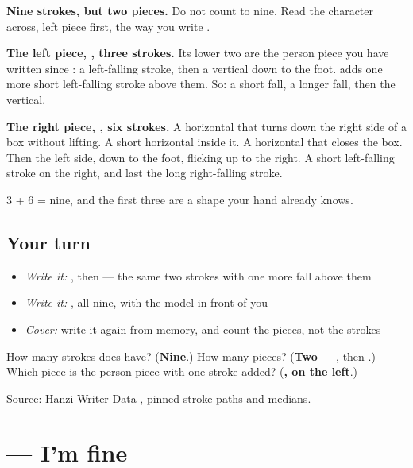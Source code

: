 \begin{quote}
\end{quote}

\textbf{Nine strokes, but two pieces.} Do not count to nine. Read the character across, left piece first, the way you write .

\textbf{The left piece, , three strokes.} Its lower two are the person piece  you have written since : a left-falling stroke, then a vertical down to the foot.  adds one more short left-falling stroke above them. So: a short fall, a longer fall, then the vertical.

\textbf{The right piece, , six strokes.} A horizontal that turns down the right side of a box without lifting. A short horizontal inside it. A horizontal that closes the box. Then the left side, down to the foot, flicking up to the right. A short left-falling stroke on the right, and last the long right-falling stroke.

3 + 6 = nine, and the first three are a shape your hand already knows.

\subsection*{Your turn}
\begin{itemize}
\raggedright
  \item \emph{Write it:} , then  — the same two strokes with one more fall above them
  \item \emph{Write it:} , all nine, with the model in front of you
  \item \emph{Cover:} write it again from memory, and count the pieces, not the strokes
\end{itemize}

\begin{tcolorbox}[breakable,colback=teal!4,colframe=teal!35!black,title={Before you move on}]
How many strokes does  have? (\textbf{Nine}.) How many pieces? (\textbf{Two} — , then .) Which piece is the person piece with one stroke added? (\textbf{, on the left}.)

Source: \href{https://raw.githubusercontent.com/chanind/hanzi-writer-data/68d10a4b21150cae5e1ebbd223eed289cf32d90c/data/\%E5\%BE\%88.json}{Hanzi Writer Data , pinned stroke paths and medians}.
\end{tcolorbox}
\section[\texorpdfstring{\zh{很好} (hěn hǎo)}{很好 (hěn hǎo)}]{ — I'm fine}


